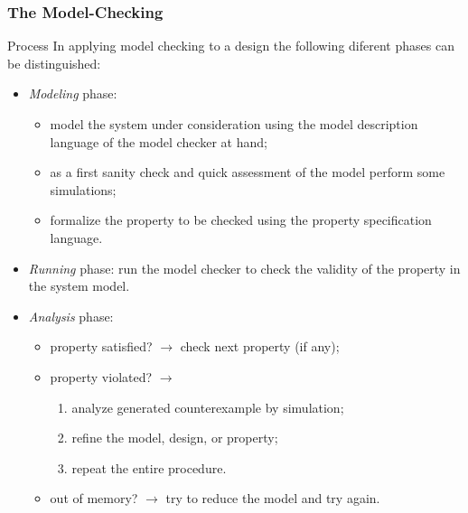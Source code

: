 \documentclass[a4paper, 10pt]{article}
\begin{document}
\subsubsection{The Model-Checking} 

Process In applying model checking to a design the 
following diferent phases can be distinguished: 
\begin{itemize}
\renewcommand{\labelitemii}{--}
\item
\emph{Modeling} phase:
	\begin{itemize}
	\item
	model the system under consideration using the model description language of 
	the model checker at hand; 
	\item
	as a first sanity check and quick assessment of the model perform some simulations;
	\item
	formalize the property to be checked using the property specification language. 
	\end{itemize}
\item
\emph{Running} phase: run 
the model checker to check the validity of the property in the system 
model. 
\item
\emph{Analysis} phase:
\begin{itemize}
	\item property satisfied? $\rightarrow$ check next property (if any); 
	\item property violated? $\rightarrow$
	\begin{enumerate}
	\item analyze generated counterexample by simulation; 
	\item refine the model, design, or property; 
	\item repeat the entire procedure. 
	\end{enumerate}
    \item out of memory? $\rightarrow$ try to reduce the model and try again.
\end{itemize}
\end{itemize}
\end{document}
